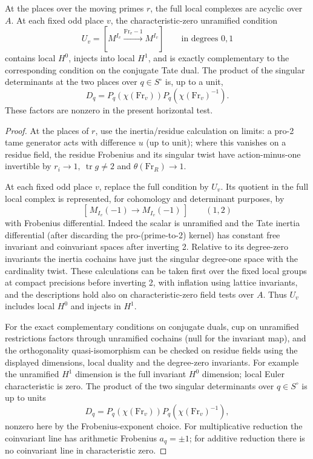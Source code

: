 \begin{lemma}\label{split-local:odd}
At the places over the moving primes \(r\), the full local complexes are acyclic over \(A\). At each fixed odd place \(v\), the characteristic-zero unramified condition
\[
 U_v=[M^{I_v}\xrightarrow{\mathrm{Fr}_v-1}M^{I_v}]
 \qquad\text{in degrees }0,1
\]
contains local \(H^0\), injects into local \(H^1\), and is exactly complementary to the corresponding condition on the conjugate Tate dual. The product of the singular determinants at the two places over \(q\in S^\circ\) is, up to a unit,
\[
 D_q=P_q(\chi(\mathrm{Fr}_v))P_q(\chi(\mathrm{Fr}_v)^{-1}).
\]
These factors are nonzero in the present horizontal test.
\end{lemma}

\begin{proof}
At the places of \(r\), use the inertia/residue calculation on limits: a pro-2 tame generator acts with difference \(u\) (up to unit); where this vanishes on a residue field, the residue Frobenius and its singular twist have action-minus-one invertible by \(r_i\to1,\ \operatorname{tr}g\ne2\) and \(\theta(\mathrm{Fr}_R)\to1\). 

At each fixed odd place \(v\), replace the full condition by \(U_v\). Its quotient in the full local complex is represented, for cohomology and determinant purposes, by
\[
                     [\,M_{I_v}(-1)\longrightarrow M_{I_v}(-1)\,]
                         \qquad (1,2)
\]
with Frobenius differential. Indeed the scalar is unramified and the Tate inertia differential (after discarding the pro-(prime-to-2) kernel) has constant free invariant and coinvariant spaces after inverting 2. Relative to its degree-zero invariants the inertia cochains have just the singular degree-one space with the cardinality twist. These calculations can be taken first over the fixed local groups at compact precisions before inverting 2, with inflation using lattice invariants, and the descriptions hold also on characteristic-zero field tests over \(A\). Thus \(U_v\) includes local \(H^0\) and injects in \(H^1\).

For the exact complementary conditions on conjugate duals, cup on unramified restrictions factors through unramified cochains (null for the invariant map), and the orthogonality quasi-isomorphism can be checked on residue fields using the displayed dimensions, local duality and the degree-zero invariants. For example the unramified \(H^1\) dimension is the full invariant \(H^0\) dimension; local Euler characteristic is zero. The product of the two singular determinants over \(q\in S^\circ\) is up to units
\[
                   D_q=P_q(\chi(\mathrm{Fr}_v))P_q(\chi(\mathrm{Fr}_v)^{-1}),
\]
nonzero here by the Frobenius-exponent choice. For multiplicative reduction the coinvariant line has arithmetic Frobenius \(a_q=\pm1\); for additive reduction there is no coinvariant line in characteristic zero.
\end{proof}

